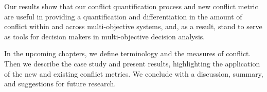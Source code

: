 Our results show that our conflict quantification process and new conflict metric are useful in providing a quantification and differentiation in the amount of conflict within and across multi-objective systems, and, as a result, stand to serve as tools for decision makers in multi-objective decision analysis.

In the upcoming chapters, we define terminology and the measures of conflict. Then we describe the case study and present results, highlighting the application of the new and existing conflict metrics. We conclude with a discussion, summary, and suggestions for future research.